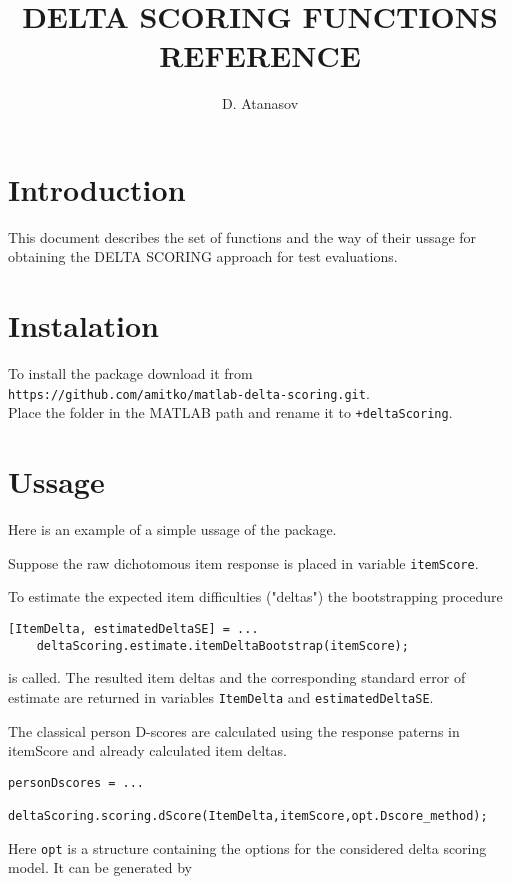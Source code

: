 \documentclass[12pt]{article}
\title{DELTA SCORING FUNCTIONS REFERENCE}
\author{D. Atanasov}
\begin{document}
\maketitle

\section{Introduction}
This document describes the set of functions and the way of their ussage for obtaining the DELTA SCORING approach for test evaluations.

\section{Instalation}
To install the package download it from \\
{\tt https://github.com/amitko/matlab-delta-scoring.git}. 
\\
Place the folder in the MATLAB path and rename it to {\tt +deltaScoring}.

\section{Ussage}
Here is an example of a simple ussage of the package.

Suppose the raw dichotomous item response is placed in variable {\tt itemScore}.

To estimate the expected item difficulties ("deltas") the bootstrapping procedure

\begin{lstlisting}[style=Matlab-bw]
[ItemDelta, estimatedDeltaSE] = ...
	deltaScoring.estimate.itemDeltaBootstrap(itemScore);
\end{lstlisting}

is called. The resulted item deltas and the corresponding standard error of estimate are returned in variables {\tt ItemDelta} and  {\tt estimatedDeltaSE}.

The classical person D-scores are calculated using the response paterns in itemScore and already calculated item deltas.

\begin{lstlisting}[style=Matlab-bw]
personDscores = ...
	deltaScoring.scoring.dScore(ItemDelta,itemScore,opt.Dscore_method);
\end{lstlisting}

Here {\tt opt} is a structure containing the options for the considered delta scoring model. It can be generated by
\end{document}
